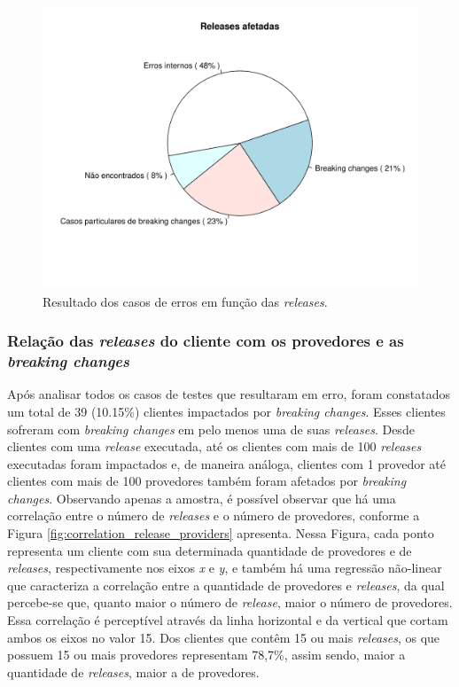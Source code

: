 \begin{figure}
    \centering
    \includegraphics[scale=0.8]{figuras/pre_res_rq1.pdf}
    \caption{Resultado dos casos de erros em função das \textit{releases}.}
    \label{fig:pre_res_rq1}
\end{figure}{}

\subsubsection{Relação das \textit{releases} do cliente com os provedores e as \textit{breaking changes}}

Após analisar todos os casos de testes que resultaram em erro, foram constatados um total de 39 (10.15\%) clientes impactados por \textit{breaking changes}. Esses clientes sofreram com \textit{breaking changes} em pelo menos uma de suas \textit{releases}. Desde clientes com uma \textit{release} executada, até os clientes com mais de 100 \textit{releases} executadas foram impactados e, de maneira análoga, clientes com 1 provedor até clientes com mais de 100 provedores também foram afetados por \textit{breaking changes}. Observando apenas a amostra, é possível observar que há uma correlação entre o número de \textit{releases} e o número de provedores, conforme a Figura \ref{fig:correlation_release_providers} apresenta. Nessa Figura, cada ponto representa um cliente com sua determinada quantidade de provedores e de \textit{releases}, respectivamente nos eixos \textit{x} e \textit{y}, e também há uma regressão não-linear que caracteriza a correlação entre a quantidade de provedores e \textit{releases}, da qual percebe-se que, quanto maior o número de \textit{release}, maior o número de provedores. Essa correlação é perceptível através da linha horizontal e da vertical que cortam ambos os eixos no valor 15. Dos clientes que contêm 15 ou mais \textit{releases}, os que possuem 15 ou mais provedores representam 78,7\%, assim sendo, maior a quantidade de \textit{releases}, maior a de provedores.

